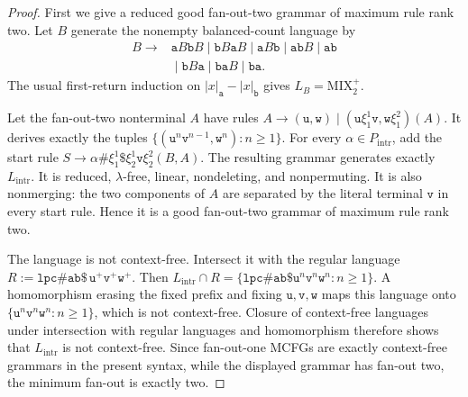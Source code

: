 \begin{proof}
First we give a reduced good fan-out-two grammar of maximum rule rank two.
Let $B$ generate the nonempty balanced-count language by
\[
\begin{aligned}
 B\to{}&
 \mathtt a B\mathtt b B
 \mid \mathtt b B\mathtt a B
 \mid \mathtt a B\mathtt b
 \mid \mathtt a\mathtt b B
 \mid \mathtt a\mathtt b\\
 &{}\mid
 \mathtt b B\mathtt a
 \mid \mathtt b\mathtt a B
 \mid \mathtt b\mathtt a .
\end{aligned}
\]
The usual first-return induction on
$|x|_{\mathtt a}-|x|_{\mathtt b}$ gives
$L_B=\mathrm{MIX}_2^+$.

Let the fan-out-two nonterminal $A$ have rules
\(A\to(\mathtt u,\mathtt w) \mid (\mathtt u\xi_1^1\mathtt v,\mathtt w\xi_1^2)(A).\)
It derives exactly the tuples
\(\{(\mathtt u^n\mathtt v^{n-1},\mathtt w^n):n\ge1\}.\)
For every $\alpha\in P_{\mathrm{intr}}$, add the start rule
\(S\to \alpha\mathtt{\#}\xi_1^1\mathtt{\$} \xi_2^1\mathtt v\xi_2^2(B,A).\)
The resulting grammar generates exactly $L_{\mathrm{intr}}$.  It is reduced,
$\lambda$-free, linear, nondeleting, and nonpermuting.  It is also nonmerging:
the two components of $A$ are separated by the literal terminal $\mathtt v$
in every start rule.  Hence it is a good fan-out-two grammar of maximum rule
rank two.

The language is not context-free.  Intersect it with the regular language
\(R:= \mathtt{lpc\#ab\$}\, \mathtt u^+\mathtt v^+\mathtt w^+ .\)
Then
\(L_{\mathrm{intr}}\cap R = \{\mathtt{lpc\#ab\$}\mathtt u^n\mathtt v^n\mathtt w^n:n\ge1\}.\)
A homomorphism erasing the fixed prefix and fixing
$\mathtt u,\mathtt v,\mathtt w$ maps this language onto
$\{\mathtt u^n\mathtt v^n\mathtt w^n:n\ge1\}$, which is not context-free.
Closure of context-free languages under intersection with regular languages
and homomorphism therefore shows that $L_{\mathrm{intr}}$ is not
context-free.  Since fan-out-one MCFGs are exactly context-free grammars in
the present syntax, while the displayed grammar has fan-out two, the minimum
fan-out is exactly two.


\end{proof}
